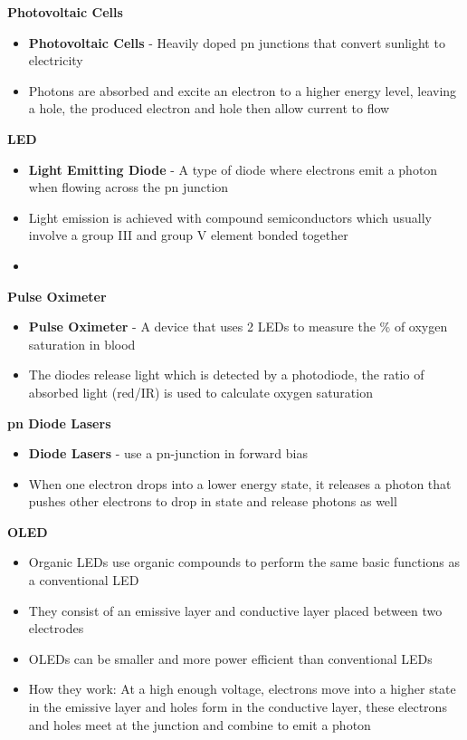\textbf{Photovoltaic Cells}
\begin{itemize}
    \item \textbf{Photovoltaic Cells} - Heavily doped pn junctions that convert sunlight to electricity
    \item Photons are absorbed and excite an electron to a higher energy level, leaving a hole, the produced electron and hole then allow current to flow
\end{itemize}

\textbf{LED}
\begin{itemize}
    \item \textbf{Light Emitting Diode} - A type of diode where electrons emit a photon when flowing across the pn junction
    \item Light emission is achieved with compound semiconductors which usually involve a group III and group V element bonded together
    \item 
\end{itemize}

\textbf{Pulse Oximeter}
\begin{itemize}
    \item \textbf{Pulse Oximeter} - A device that uses 2 LEDs to measure the \% of oxygen saturation in blood
    \item The diodes release light which is detected by a photodiode, the ratio of absorbed light (red/IR) is used to calculate oxygen saturation
\end{itemize}

\textbf{pn Diode Lasers}
\begin{itemize}
    \item \textbf{Diode Lasers} - use a pn-junction in forward bias 
    \item When one electron drops into a lower energy state, it releases a photon that pushes other electrons to drop in state and release photons as well
\end{itemize}

\textbf{OLED}
\begin{itemize}
    \item Organic LEDs use organic compounds to perform the same basic functions as a conventional LED
    \item They consist of an emissive layer and conductive layer placed between two electrodes
    \item OLEDs can be smaller and more power efficient than conventional LEDs
    \item How they work: At a high enough voltage, electrons move into a higher state in the emissive layer and holes form in the conductive layer, these electrons and holes meet at the junction and combine to emit a photon
\end{itemize}


